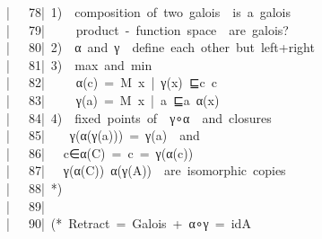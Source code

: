 \documentclass{article}
\newcommand{\syntaxCOMMENTA}[1]{\textcolor[rgb]{0.8,0.0,0.0}{#1}}
\newcommand{\syntaxCOMMENTA}[1]{\textcolor[rgb]{0.8,0.0,0.0}{#1}}
\newcommand{\syntaxCOMMENTA}[1]{\textcolor[rgb]{0.8,0.0,0.0}{#1}}
\newcommand{\syntaxCOMMENTA}[1]{\textcolor[rgb]{0.8,0.0,0.0}{\textbf{#1}}}
\newcommand{\syntaxCOMMENTA}[1]{\textcolor[rgb]{0.8,0.0,0.0}{#1}}
\newcommand{\syntaxCOMMENTA}[1]{\textcolor[rgb]{0.8,0.0,0.0}{#1}}
\newcommand{\syntaxCOMMENTA}[1]{\textcolor[rgb]{0.0,0.0,0.0}{#1}}
\newcommand{\gutter}[1]{\textcolor[rgb]{0,0,0}{{|}#1}}
\newcommand{\gutterH}[1]{\textcolor[rgb]{1,0,0}{{|}#1}}
\begin{document}
\gutter{\ \ \ 78{|}\ }\syntaxCOMMENTA{1){\ }{\ }composition{\ }of{\ }two{\ }galois{\ }{\ }is{\ }a{\ }galois}\hspace*{\fill}\\
\gutter{\ \ \ 79{|}\ }\syntaxCOMMENTA{{\ }{\ }{\ }{\ }product{\ }{-}{\ }function{\ }space{\ }{\ }are{\ }galois?{\ }}\hspace*{\fill}\\
\gutterH{\ \ \ 80{|}\ }\syntaxCOMMENTA{2){\ }{\ }α{\ }and{\ }γ{\ }{\ }define{\ }each{\ }other{\ }but{\ }left+right}\hspace*{\fill}\\
\gutter{\ \ \ 81{|}\ }\syntaxCOMMENTA{3){\ }{\ }max{\ }and{\ }min}\hspace*{\fill}\\
\gutter{\ \ \ 82{|}\ }\syntaxCOMMENTA{{\ }{\ }{\ }{\ }α(c){\ }={\ }M{\ }\usebox{\opencurlybracket}x{\ }|{\ }γ(x){\ }⊑c{\ }c{\ }\usebox{\closecurlybracket}{\ }}\hspace*{\fill}\\
\gutter{\ \ \ 83{|}\ }\syntaxCOMMENTA{{\ }{\ }{\ }{\ }γ(a){\ }={\ }M{\ }\usebox{\opencurlybracket}x{\ }|{\ }a{\ }⊑a{\ }α(x){\ }\usebox{\closecurlybracket}}\hspace*{\fill}\\
\gutter{\ \ \ 84{|}\ }\syntaxCOMMENTA{4){\ }{\ }fixed{\ }points{\ }of{\ }{\ }γ∘α{\ }{\ }and{\ }closures{\ }}\hspace*{\fill}\\
\gutterH{\ \ \ 85{|}\ }\syntaxCOMMENTA{{\ }{\ }{\ }γ(α(γ(a))){\ }={\ }γ(a){\ }{\ }and{\ }}\hspace*{\fill}\\
\gutter{\ \ \ 86{|}\ }\syntaxCOMMENTA{{\ }{\ }c∈α(C){\ }\usebox{\lessthan}{\ }={\ }\usebox{\greaterthan}{\ }{\ }c{\ }={\ }γ(α(c))}\hspace*{\fill}\\
\gutter{\ \ \ 87{|}\ }\syntaxCOMMENTA{{\ }{\ }γ(α(C)){\ }α(γ(A)){\ }{\ }are{\ }isomorphic{\ }copies}\hspace*{\fill}\\
\gutter{\ \ \ 88{|}\ }\syntaxCOMMENTA{*)}\hspace*{\fill}\\
\gutter{\ \ \ 89{|}\ }\hspace*{\fill}\\
\gutterH{\ \ \ 90{|}\ }\syntaxCOMMENTA{(*{\ }Retract{\ }={\ }Galois{\ }+{\ }α∘γ{\ }={\ }id\usebox{\underscorebox}A{\ }}\hspace*{\fill}\\
\end{document}
